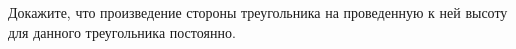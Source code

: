 \begin{ex}
	\begin{condition}
		Докажите, что произведение стороны треугольника на проведенную к ней высоту для данного треугольника постоянно.
	\end{condition}
\end{ex}